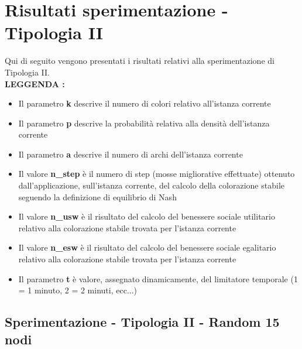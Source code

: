 \section{Risultati sperimentazione - Tipologia II}
\justify
Qui di seguito vengono presentati i risultati relativi alla sperimentazione di Tipologia II.\\

\textbf{LEGGENDA : }

\begin{itemize}
	\item Il parametro \textbf{k} descrive il numero di colori relativo all'istanza corrente
	\item Il parametro \textbf{p} descrive la probabilità relativa alla densità dell'istanza corrente
	\item Il parametro \textbf{a} descrive il numero di archi dell'istanza corrente
	\item Il valore \textbf{n\_step} è il numero di step (mosse migliorative effettuate) ottenuto dall'applicazione, sull'istanza corrente, del calcolo della colorazione stabile seguendo la definizione di equilibrio di Nash
	\item Il valore \textbf{n\_usw} è il risultato del calcolo del benessere sociale utilitario relativo alla colorazione stabile trovata per l'istanza corrente
	\item Il valore \textbf{n\_esw} è il risultato del calcolo del benessere sociale egalitario relativo alla colorazione stabile trovata per l'istanza corrente
	\item Il parametro \textbf{t} è valore, assegnato dinamicamente, del limitatore temporale (1 = 1 minuto, 2 = 2 minuti, ecc...)
\end{itemize}

\subsection{Sperimentazione - Tipologia II - Random 15 nodi}

